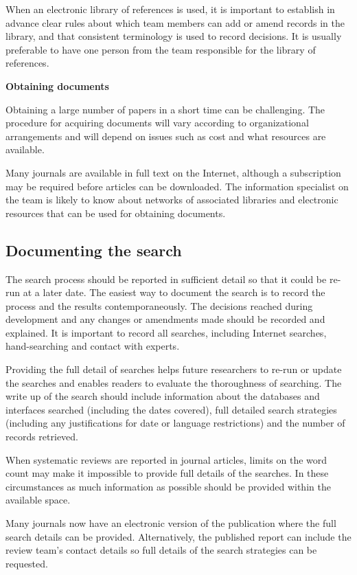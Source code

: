 \documentclass[
  11pt,
  a4paper,
  DIV=11,
  numbers=noendperiod]{scrreprt}
\begin{document}
When an electronic library of references is used, it is important to
establish in advance clear rules about which team members can add or
amend records in the library, and that consistent terminology is used to
record decisions. It is usually preferable to have one person from the
team responsible for the library of references.

\textbf{Obtaining documents}

Obtaining a large number of papers in a short time can be challenging.
The procedure for acquiring documents will vary according to
organizational arrangements and will depend on issues such as cost and
what resources are available.

Many journals are available in full text on the Internet, although a
subscription may be required before articles can be downloaded. The
information specialist on the team is likely to know about networks of
associated libraries and electronic resources that can be used for
obtaining documents.

\subsection{Documenting the search}\label{documenting-the-search}

The search process should be reported in sufficient detail so that it
could be re-run at a later date. The easiest way to document the search
is to record the process and the results contemporaneously. The
decisions reached during development and any changes or amendments made
should be recorded and explained. It is important to record all
searches, including Internet searches, hand-searching and contact with
experts.

Providing the full detail of searches helps future researchers to re-run
or update the searches and enables readers to evaluate the thoroughness
of searching. The write up of the search should include information
about the databases and interfaces searched (including the dates
covered), full detailed search strategies (including any justifications
for date or language restrictions) and the number of records retrieved.

When systematic reviews are reported in journal articles, limits on the
word count may make it impossible to provide full details of the
searches. In these circumstances as much information as possible should
be provided within the available space.

Many journals now have an electronic version of the publication where
the full search details can be provided. Alternatively, the published
report can include the review team's contact details so full details of
the search strategies can be requested.
\end{document}
